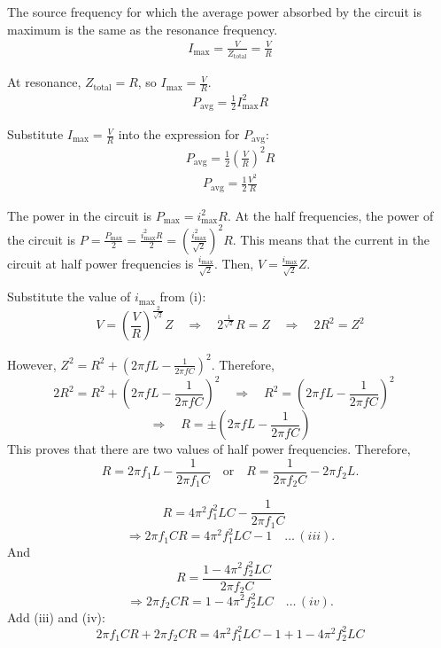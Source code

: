 \documentclass[journal,12pt,twocolumn]{IEEEtran}
\theoremstyle{remark}
\begin{document}
The source frequency for which the average power absorbed by the circuit is maximum is the same as the resonance frequency. 
\begin{align}
    I_{\text{max}} = \frac{V}{Z_{\text{total}}} = \frac{V}{R}
\end{align}

At resonance, \(Z_{\text{total}} = R\), so \(I_{\text{max}} = \frac{V}{R}\).
\begin{align}
    P_{\text{avg}} = \frac{1}{2} I_{\text{max}}^2 R
\end{align}

Substitute \(I_{\text{max}} = \frac{V}{R}\) into the expression for \(P_{\text{avg}}\):
\begin{align}
    P_{\text{avg}} = \frac{1}{2} \left(\frac{V}{R}\right)^2 R
\end{align}
\begin{align}
    P_{\text{avg}} = \frac{1}{2} \frac{V^2}{R}
    \label{eq:9}
\end{align}



The power in the circuit is $P_{\text{max}} = i_{\text{max}}^2 R$. At the half frequencies, the power of the circuit is $P = \frac{P_{\text{max}}}{2} = \frac{i_{\text{max}}^2 R}{2} = \left(\frac{i_{\text{max}}^2}{\sqrt{2}}\right)^2 R$. This means that the current in the circuit at half power frequencies is $\frac{i_{\text{max}}}{\sqrt{2}}$. Then, $V = \frac{i_{\text{max}}}{\sqrt{2}} Z$.

Substitute the value of $i_{\text{max}}$ from (i):
\[
V = \left(\frac{V}{R}\right)^{\frac{2}{\sqrt{2}}} Z \quad \Rightarrow \quad 2^{\frac{1}{\sqrt{2}}} R = Z \quad \Rightarrow \quad 2R^2 = Z^2
\]

However, $Z^2 = R^2 + \left(2\pi f L - \frac{1}{2\pi f C}\right)^2$. Therefore,
\[
2R^2 = R^2 + \left(2\pi f L - \frac{1}{2\pi f C}\right)^2 \quad \Rightarrow \quad R^2 = \left(2\pi f L - \frac{1}{2\pi f C}\right)^2 \quad 
\]
\[
\Rightarrow \quad R = \pm \left(2\pi f L - \frac{1}{2\pi f C}\right)\]
This proves that there are two values of half power frequencies. Therefore,
\[
R = 2\pi f_1 L - \frac{1}{2\pi f_1 C} \quad \text{or} \quad R = \frac{1}{2\pi f_2 C} - 2\pi f_2 L.
\]

\[
R = 4\pi^2 f_1^2 LC - \frac{1}{2\pi f_1 C} \quad 
\]
\[
\Rightarrow 2\pi f_1 C R = 4\pi^2 f_1^2 LC - 1 \quad \ldots \, (iii).\]
And
\[
R = \frac{1 - 4\pi^2 f_2^2 LC}{2\pi f_2 C} \quad 
\]
\[
\Rightarrow 2\pi f_2 C R = 1 - 4\pi^2 f_2^2 LC \quad \ldots \, (iv).\]
Add (iii) and (iv):
\[
2\pi f_1 C R + 2\pi f_2 C R = 4\pi^2 f_1^2 LC - 1 + 1 - 4\pi^2 f_2^2 LC
\]
\end{document}
